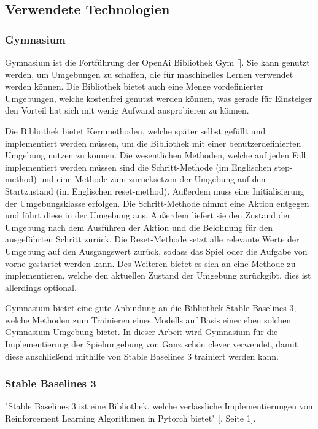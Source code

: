 \subsection{Verwendete Technologien}
\subsubsection{Gymnasium}
Gymnasium ist die Fortführung der OpenAi Bibliothek Gym [\cite{noauthor_gymnasium_nodate}]. Sie kann genutzt werden, um Umgebungen zu schaffen, die für maschinelles Lernen verwendet werden können. Die Bibliothek bietet auch eine Menge vordefinierter Umgebungen, welche kostenfrei genutzt werden können, was gerade für Einsteiger den Vorteil hat sich mit wenig Aufwand ausprobieren zu können.

Die Bibliothek bietet Kernmethoden, welche später selbst gefüllt und implementiert werden müssen, um die Bibliothek mit einer benutzerdefinierten Umgebung nutzen zu können. Die wesentlichen Methoden, welche auf jeden Fall implementiert werden müssen sind die Schritt-Methode (im Englischen step-method) und eine Methode zum zurücksetzen der Umgebung auf den Startzustand (im Englischen reset-method). Außerdem muss eine Initialisierung der Umgebungsklasse erfolgen. Die Schritt-Methode nimmt eine Aktion entgegen und führt diese in der Umgebung aus. Außerdem liefert sie den Zustand der Umgebung nach dem Ausführen der Aktion und die Belohnung für den ausgeführten Schritt zurück. Die Reset-Methode setzt alle relevante Werte der Umgebung auf den Ausgangswert zurück, sodass das Spiel oder die Aufgabe von vorne gestartet werden kann. Des Weiteren bietet es sich an eine Methode zu implementieren, welche den aktuellen Zustand der Umgebung zurückgibt, dies ist allerdings optional.

Gymnasium bietet eine gute Anbindung an die Bibliothek Stable Baselines 3, welche Methoden zum Trainieren eines Modells auf Basis einer eben solchen Gymnasium Umgebung bietet. In dieser Arbeit wird Gymnasium für die Implementierung der Spielumgebung von Ganz schön clever verwendet, damit diese anschließend mithilfe von Stable Baselines 3 trainiert werden kann.
\subsubsection{Stable Baselines 3}
"Stable Baselines 3 ist eine Bibliothek, welche verlässliche Implementierungen von Reinforcement Learning Algorithmen in Pytorch bietet" [\cite{noauthor_stable-baselines3_nodate}, Seite 1]. 

